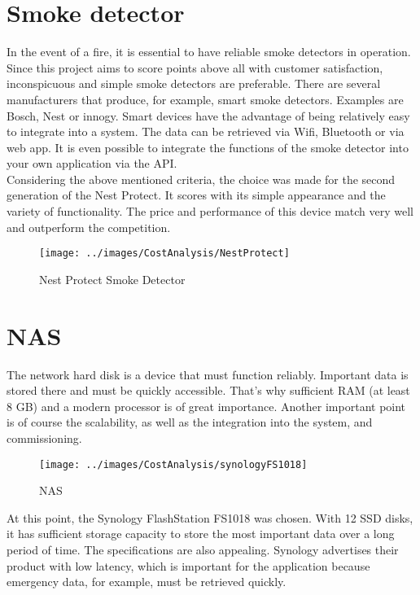 \section{Smoke detector}
In the event of a fire, it is essential to have reliable smoke detectors in operation. Since this project aims to score points above all with customer satisfaction, inconspicuous and simple smoke detectors are preferable. There are several manufacturers that produce, for example, smart smoke detectors. Examples are Bosch, Nest or innogy. Smart devices have the advantage of being relatively easy to integrate into a system. The data can be retrieved via Wifi, Bluetooth or via web app. It is even possible to integrate the functions of the smoke detector into your own application via the API.
\\
Considering the above mentioned criteria, the choice was made for the second generation of the Nest Protect. It scores with its simple appearance and the variety of functionality.  The price and performance of this device match very well and outperform the competition.

\begin{figure}[h]
	\centering
	\texttt{[image: ../images/CostAnalysis/NestProtect]} 
	\caption{Nest Protect Smoke Detector}
	\label{fig:smokeDetection}
\end{figure}

\section{NAS }
The network hard disk is a device that must function reliably. Important data is stored there and must be quickly accessible. That's why sufficient RAM (at least 8 GB) and a modern processor is of great importance. Another important point is of course the scalability, as well as the integration into the system, and commissioning.

\begin{figure}[h]
	\centering
	\texttt{[image: ../images/CostAnalysis/synologyFS1018]} %
	\caption{NAS}
	\label{fig:nas}
\end{figure}

At this point, the Synology FlashStation FS1018 was chosen. With 12 SSD disks, it has sufficient storage capacity to store the most important data over a long period of time. The specifications are also appealing. Synology advertises their product with low latency, which is important for the application because emergency data, for example, must be retrieved quickly.



